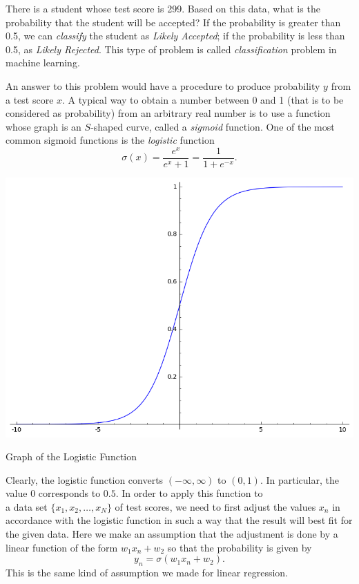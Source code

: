 \documentclass[
]{article}
\begin{document}
There is a student whose test score is 299. Based on this data, what is
the probability that the student will be accepted? If the probability is
greater than 0.5, we can \emph{classify} the student as \emph{Likely
Accepted}; if the probability is less than 0.5, as \emph{Likely
Rejected}. This type of problem is called \emph{classification} problem
in machine learning.

An answer to this problem would have a procedure to produce probability
\(y\) from a test score \(x\). A typical way to obtain a number between
0 and 1 (that is to be considered as probability) from an arbitrary real
number is to use a function whose graph is an \(S\)-shaped curve, called
a \emph{sigmoid} function. One of the most common sigmoid functions is
the \emph{logistic} function
\[ \sigma(x) = \frac {e^x}{e^x+1}= \frac 1 {1+e^{-x}}.\]

\begin{center}
\includegraphics[scale=0.2]{sigmoid}

Graph of the Logistic Function


\end{center}

Clearly, the logistic function converts \((-\infty, \infty)\) to
\((0,1)\). In particular, the value \(0\) corresponds to \(0.5\). In
order to apply this function to\\
a data set \(\{ x_1, x_2, \dots , x_N \}\) of test scores, we need to
first adjust the values \(x_n\) in accordance with the logistic function
in such a way that the result will best fit for the given data. Here we
make an assumption that the adjustment is done by a linear function of
the form \(w_1 x_n+w_2\) so that the probability is given by
\begin{equation} \label{eqn-y-sigma} y_n=\sigma(w_1 x_n +w_2). \end{equation}
This is the same kind of assumption we made for linear regression.
\end{document}
